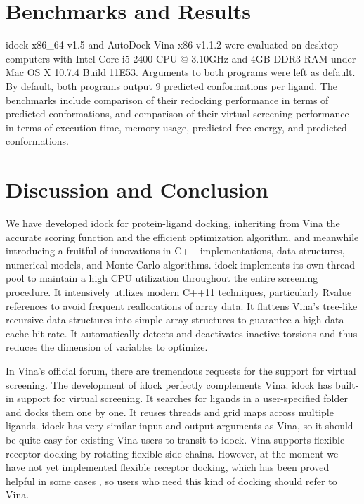 \section{Benchmarks and Results}

idock x86\_64 v1.5 and AutoDock Vina x86 v1.1.2 were evaluated on desktop computers with Intel Core i5-2400 CPU @ 3.10GHz and 4GB DDR3 RAM under Mac OS X 10.7.4 Build 11E53. Arguments to both programs were left as default. By default, both programs output 9 predicted conformations per ligand. The benchmarks include comparison of their redocking performance in terms of predicted conformations, and comparison of their virtual screening performance in terms of execution time, memory usage, predicted free energy, and predicted conformations.

\section{Discussion and Conclusion}

We have developed idock for protein-ligand docking, inheriting from Vina the accurate scoring function and the efficient optimization algorithm, and meanwhile introducing a fruitful of innovations in C++ implementations, data structures, numerical models, and Monte Carlo algorithms. idock implements its own thread pool to maintain a high CPU utilization throughout the entire screening procedure. It intensively utilizes modern C++11 techniques, particularly Rvalue references to avoid frequent reallocations of array data. It flattens Vina's tree-like recursive data structures into simple array structures to guarantee a high data cache hit rate. It automatically detects and deactivates inactive torsions and thus reduces the dimension of variables to optimize.

In Vina's official forum, there are tremendous requests for the support for virtual screening. The development of idock perfectly complements Vina. idock has built-in support for virtual screening. It searches for ligands in a user-specified folder and docks them one by one. It reuses threads and grid maps across multiple ligands. idock has very similar input and output arguments as Vina, so it should be quite easy for existing Vina users to transit to idock. Vina supports flexible receptor docking by rotating flexible side-chains. However, at the moment we have not yet implemented flexible receptor docking, which has been proved helpful in some cases \citep{1084}, so users who need this kind of docking should refer to Vina.

